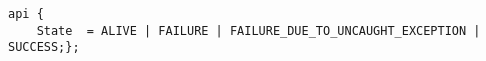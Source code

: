 \label{pkg:state}
\begin{verbatim}
api {
    State  = ALIVE | FAILURE | FAILURE_DUE_TO_UNCAUGHT_EXCEPTION | SUCCESS;};
\end{verbatim}
